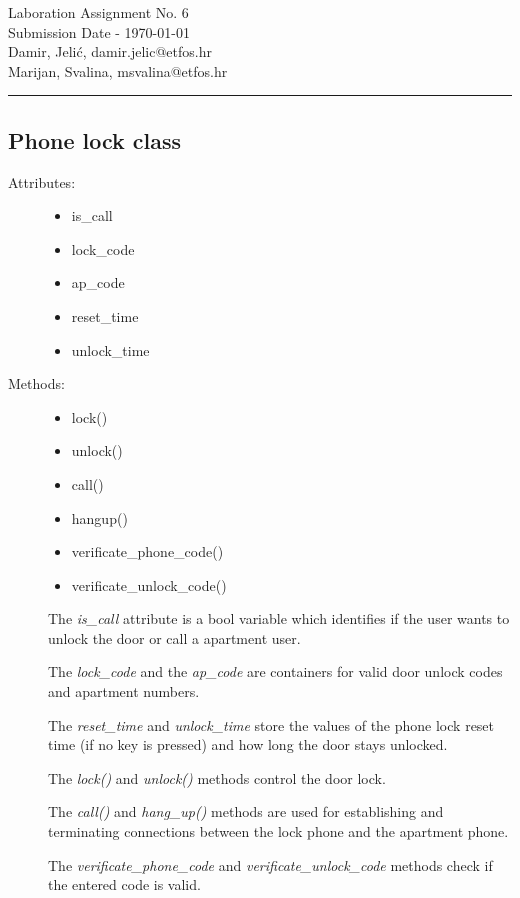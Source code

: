 \documentclass[11pt,a4paper]{article}
\begin{document}
\large
Laboration Assignment No. 6 \\
Submission Date - \yyyymmdddate \today \\
Damir, Jelić, damir.jelic@etfos.hr \\
Marijan, Svalina, msvalina@etfos.hr
\\
\rule{\linewidth}{0.1mm}

\setcounter{section}{6}
\subsection{Phone lock class}
\begin{description}
    \item[Attributes:] \hfill
    \begin{itemize}
        \item is\_call
        \item lock\_code
        \item ap\_code
        \item reset\_time
        \item unlock\_time
    \end{itemize}
    \item[Methods:] \hfill
    \begin{itemize}
        \item lock()
        \item unlock()
        \item call()
        \item hangup()
        \item verificate\_phone\_code()
        \item verificate\_unlock\_code()
    \end{itemize}
\end{description}
\begin{description}
    \item[]
    The \emph{is\_call} attribute is a bool variable which identifies if the user
    wants to unlock the door or call a apartment user.
    \item[]
    The \emph{lock\_code} and the \emph{ap\_code} are containers for valid 
    door unlock codes and apartment numbers.
    \item[]
    The \emph{reset\_time} and \emph{unlock\_time} store the values of the
    phone lock reset time (if no key is pressed) and how long the door stays
    unlocked.
    \item[]
    The \emph{lock()} and \emph{unlock()} methods control the door lock.
    \item[] 
    The \emph{call()} and \emph{hang\_up()} methods are used for establishing
    and terminating connections between the lock phone and the apartment phone.
    \item[]
    The \emph{verificate\_phone\_code} and \emph{verificate\_unlock\_code}
    methods check if the entered code is valid.

\end{description}
\end{document}
